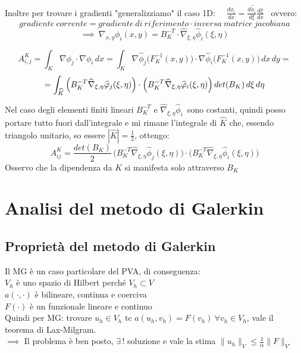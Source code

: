 \documentclass{article}
\let \oldexists \exists
\renewcommand{\exists}{\oldexists\,}
\begin{document}
Inoltre per trovare i gradienti "generalizziamo" il caso 1D: \ \ $\frac{d \phi_i}{dx} = \frac{d\hat{\phi}_i}{d\xi}\frac{d\xi}{dx}$ \ ovvero:
\[
gradiente \ corrente = gradiente\ di\ riferimento \cdot inversa \ matrice \ jacobiana \]
\[ \implies \ \nabla_{x,y} \phi_i(x,y) = B_K^{-T} \cdot \hat{\nabla}_{\xi,\eta} \hat{\phi}_i(\xi,\eta)\]

\[
A_{i,j}^K = \int_K \nabla \phi_j \cdot \nabla \phi_i\, dx = \int_K \nabla \hat{\phi}_j \big( F_K^{-1}(x,y) \big)\cdot \nabla \hat{\phi}_i\big(F_K^{-1}(x,y)\big)\,dx\,dy= \]\[= \int_{\hat{K}} \Big(B_K^{-T}\hat{\nabla}_{\xi,\eta}\hat{\phi}_j(\xi,\eta)\Big)\cdot\Big(B_K^{-T}\hat{\nabla}_{\xi,\eta}\hat{\phi}_i(\xi,\eta)\Big)\, det(B_K)\, d\xi\, d\eta\skipp
\]

Nel caso degli elementi finiti lineari $B_K^{-T}$ e $\hat{\nabla}_{\xi,\eta}\hat{\phi}_i$\, sono costanti, quindi posso portare tutto fuori dall'integrale e mi rimane l'integrale di $\hat{K}$ che, essendo triangolo unitario, so essere $|\hat{K}|=\tfrac12$, ottengo:
\[
A_{ij}^K = \frac{det(B_K)}{2}\, \Big(B_K^{-T}\hat{\nabla}_{\xi,\eta}\hat{\phi}_j(\xi,\eta)\Big)\cdot\Big(B_K^{-T}\hat{\nabla}_{\xi,\eta}\hat{\phi}_i(\xi,\eta)\Big) 
\]
Osservo che la dipendenza da $K$ si manifesta solo attraverso $B_K$\\


\newpage


\section{Analisi del metodo di Galerkin}

\subsection{Proprietà del metodo di Galerkin}

Il MG è un caso particolare del PVA, di conseguenza:\\
$V_h$ è uno spazio di Hilbert perché $V_h\subset V$\\
$a(\cdot,\cdot)$ è bilineare, continua e coerciva\\
$F(\cdot)$ è un funzionale lineare e continuo\\

Quindi per MG: trovare $u_h\in V_h$ tc $a(u_h,v_h)=F(v_h) \ \forall v_h\in V_h$, vale il teorema di Lax-Milgram.\\
$\implies$ Il problema è ben posto, $\exists!$ soluzione e vale la stima $\|u_h\|_V\le \frac{1}{\alpha} \|F\|_{V'}$\\
\end{document}
